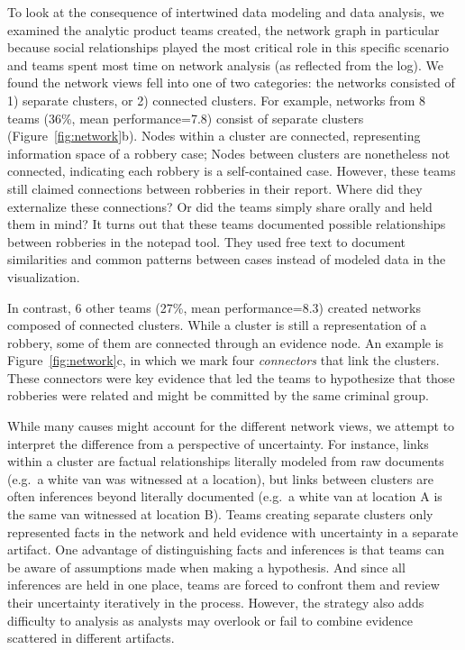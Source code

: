 To look at the consequence of intertwined data modeling and data
analysis, we examined the analytic product teams created, the network
graph in particular because social relationships played the most
critical role in this specific scenario and teams spent most time on
network analysis (as reflected from the log). We found the network views
fell into one of two categories: the networks consisted of 1) separate
clusters, or 2) connected clusters. For example, networks from 8 teams
(36\%, mean performance=7.8) consist of separate clusters (Figure~\ref{fig:network}b). Nodes within a cluster are connected,
representing information space of a robbery case; Nodes between clusters
are nonetheless not connected, indicating each robbery is a
self-contained case. However, these teams still claimed connections
between robberies in their report. Where did they externalize these
connections? Or did the teams simply share orally and held them in mind?
It turns out that these teams documented possible relationships between
robberies in the notepad tool. They used free text to document similarities and common patterns between cases instead of modeled data in the visualization.

In contrast, 6 other teams (27\%, mean performance=8.3) created networks
composed of connected clusters. While a cluster is still a
representation of a robbery, some of them are connected through an
evidence node. An example is Figure~\ref{fig:network}c, in which we
mark four \emph{connectors} that link the clusters. These connectors
were key evidence that led the teams to hypothesize that those robberies
were related and might be committed by the same criminal group.

While many causes might account for the different network views, we
attempt to interpret the difference from a perspective of uncertainty.
For instance, links within a cluster are factual relationships literally
modeled from raw documents (e.g.~a white van was witnessed at a
location), but links between clusters are often inferences beyond
literally documented (e.g.~a white van at location A is the same van
witnessed at location B). Teams creating separate clusters only
represented facts in the network and held evidence with uncertainty in a
separate artifact. One advantage of distinguishing facts and inferences
is that teams can be aware of assumptions made when making a hypothesis.
And since all inferences are held in one place, teams are forced to
confront them and review their uncertainty iteratively in the process.
However, the strategy also adds difficulty to analysis as analysts may
overlook or fail to combine evidence scattered in different artifacts.

